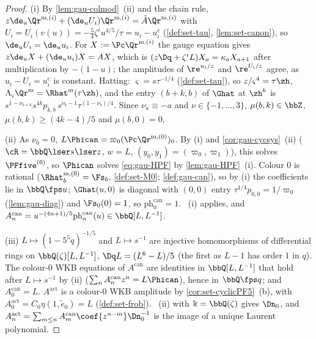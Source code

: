 \begin{proof}
(i) By \cref{lem:gau-colmod}~(ii) and the chain rule, $z\de_u\Qr^{\mathrm m,(i)}+(\de_uU_i)\Qr^{\mathrm m,(i)}=\tilde A\Qr^{\mathrm m,(i)}$ with $U_i=U_i(v(u))=-\frac54\zeta^iu^{4/5}/\tau=u_i-u_i^{\mathrm c}$ (\cref{def:set-tau}, \cref{lem:set-canon}), so $\de_uU_i=\de_uu_i$. For $X:=\Pc\Qr^{\mathrm m,(i)}$ the gauge equation gives $z\de_uX+(\de_uu_i)X=AX$, which is $(z\Dq+\zeta^iL)X_a=\kappa_aX_{a+1}$ after multiplication by $-(1-u)$; the amplitudes of $\re^{u_i/z}$ and $\re^{U_i/z}$ agree, as $u_i-U_i=u_i^{\mathrm c}$ is constant. Hatting: $\varsigma=s\tau^{-1/4}$ (\cref{def:set-tau}), so $z/\varsigma^4=\tau\zh$, $\Lambda_\varsigma\Qr^{\mathrm m}=\Rhat^{\mathrm m}(\tau\zh)$, and the entry $(b+k,b)$ of $\Ghat$ at $\zh^k$ is $s^{1-\nu_{b+k}}s^{4k}p_{k,b}\,s^{\nu_b-1}\tau^{(1-\nu_b)/4}$. Since $\nu_a\equiv-a$ and $\nu\in\{-1,\dots,3\}$, $\mu(b,k)\in\bbZ$, $\mu(b,k)\geq(4k-4)/5$ and $\mu(b,0)=0$.

(ii) As $\nu_0=0$, $L\Phican=\varpi_0(\Pc\Qr^{\mathrm m,(0)})_0$. By (i) and \cref{cor:gau-cycsys}~(ii) ($\cR=\bbQ\lser s\lser z$, $w=L$, $(y_0,y_1)=(\varpi_0,\varpi_1)$), this solves $\PFfive^{(0)}$, so $\Phican$ solves \eqref{eq:gau-HPF} by \cref{lem:gau-HPF}~(i). Colour $0$ is rational ($\Rhat^{\mathrm m,(0)}_b=\Fs_b$, \cref{def:set-M0}; \cref{def:gau-can}), so by (i) the coefficients lie in $\bbQ\fps u$; $\Ghat(u,0)$ is diagonal with $(0,0)$ entry $\tau^{1/4}p_{0,0}=1/\varpi_0$ (\cref{lem:gau-diag}) and $\Fs_0(0)=1$, so $\mathrm{ph}^{\mathrm{can}}_0=1$. ~(i) applies, and $A^{\mathrm{can}}_n=u^{-(4n+1)/5}\mathrm{ph}^{\mathrm{can}}_n(u)\in\bbQ[L,L^{-1}]$.

(iii) $L\mapsto(1-5^5q)^{-1/5}$ and $L\mapsto s^{-1}$ are injective homomorphisms of differential rings on $\bbQ(\zeta)[L,L^{-1}]$, $\Dq L=(L^6-L)/5$ (the first as $L-1$ has order $1$ in $q$). The colour-$0$ WKB equations of $A^{\mathrm{can}}$ are identities in $\bbQ[L,L^{-1}]$ that hold after $L\mapsto s^{-1}$ by (ii) ($\sum_nA^{\mathrm{can}}_nz^n=L\Phican$), hence in $\bbQ\fps q$; and $A^{\mathrm{can}}_0=L$. $A^{\mathrm{act}}$ is a colour-$0$ WKB amplitude by \cref{cor:set-cyclicPF5}~(b), with $A^{\mathrm{act}}_0=C_0\eta(1,\tilde e_0)=L$ (\cref{def:set-frob}). ~(ii) with $\Bbbk=\bbQ(\zeta)$ gives $\Dn_0$, and $A^{\mathrm{act}}_n=\sum_{m\leq n}A^{\mathrm{can}}_m\coef{z^{n-m}}\Dn_0^{-1}$ is the image of a unique Laurent polynomial.


\end{proof}
